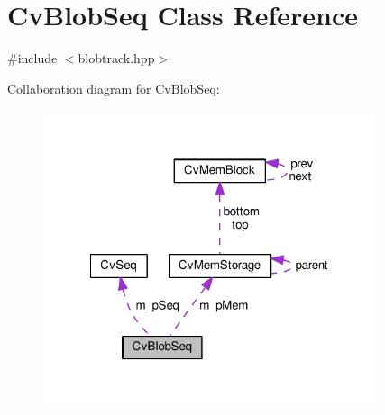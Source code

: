 \hypertarget{classCvBlobSeq}{\section{Cv\-Blob\-Seq Class Reference}
\label{classCvBlobSeq}
}


{\ttfamily \#include $<$blobtrack.\-hpp$>$}



Collaboration diagram for Cv\-Blob\-Seq\-:\nopagebreak
\begin{figure}[H]
\begin{center}
\leavevmode
\includegraphics[width=278pt]{classCvBlobSeq__coll__graph}
\end{center}
\end{figure}
